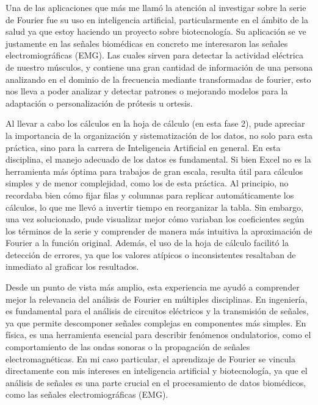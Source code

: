 {Una de las aplicaciones que más me llamó la atención al investigar sobre la serie de Fourier fue su uso en inteligencia artificial, particularmente en el ámbito de la salud ya que estoy haciendo un proyecto sobre biotecnología. Su aplicación se ve justamente en las señales biomédicas en concreto me interesaron las señales electromiográficas (EMG). Las cuales sirven para detectar la actividad eléctrica de nuestro músculos, y contiene una gran cantidad de información de una persona analizando en el dominio de la frecuencia mediante transformadas de fourier, esto nos lleva a poder analizar y detectar patrones o mejorando modelos para la adaptación o personalización de prótesis u ortesis.

\newpage

Al llevar a cabo los cálculos en la hoja de cálculo (en esta fase 2), pude apreciar la importancia de la organización y sistematización de los datos, no solo para esta práctica, sino para la carrera de Inteligencia Artificial en general. En esta disciplina, el manejo adecuado de los datos es fundamental. Si bien Excel no es la herramienta más óptima para trabajos de gran escala, resulta útil para cálculos simples y de menor complejidad, como los de esta práctica. Al principio, no recordaba bien cómo fijar filas y columnas para replicar automáticamente los cálculos, lo que me llevó a invertir tiempo en reorganizar la tabla. Sin embargo, una vez solucionado, pude visualizar mejor cómo variaban los coeficientes según los términos de la serie y comprender de manera más intuitiva la aproximación de Fourier a la función original. Además, el uso de la hoja de cálculo facilitó la detección de errores, ya que los valores atípicos o inconsistentes resaltaban de inmediato al graficar los resultados.

Desde un punto de vista más amplio, esta experiencia me ayudó a comprender mejor la relevancia del análisis de Fourier en múltiples disciplinas. En ingeniería, es fundamental para el análisis de circuitos eléctricos y la transmisión de señales, ya que permite descomponer señales complejas en componentes más simples. En física, es una herramienta esencial para describir fenómenos ondulatorios, como el comportamiento de las ondas sonoras o la propagación de señales electromagnéticas. En mi caso particular, el aprendizaje de Fourier se vincula directamente con mis intereses en inteligencia artificial y biotecnología, ya que el análisis de señales es una parte crucial en el procesamiento de datos biomédicos, como las señales electromiográficas (EMG).

}
